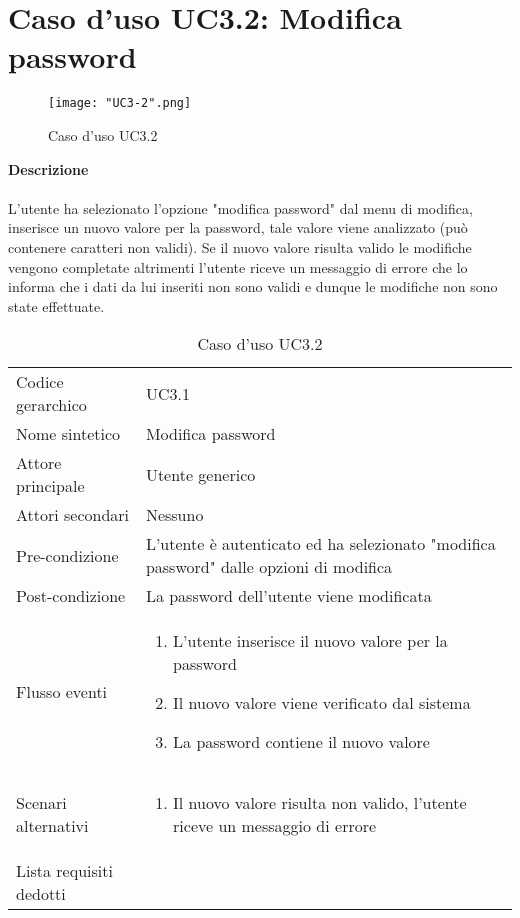 \documentclass[a4paper]{report}
\begin{document}
	 \section{Caso d'uso UC3.2: Modifica password}
	 	\begin{figure}[H]
			\centering
			\texttt{[image: "UC3-2".png]}
			\caption{Caso d'uso UC3.2}
		\end{figure}
	 \textbf{Descrizione} \\ \\
	 L'utente ha selezionato l'opzione "modifica password" dal menu di modifica, inserisce un nuovo valore
	 per la password, tale valore viene analizzato (può contenere caratteri non validi). 
	 Se il nuovo valore risulta valido le modifiche vengono completate altrimenti l'utente riceve 
	 un messaggio di errore che lo informa che i dati da lui inseriti non sono validi e dunque le modifiche non
	 sono state effettuate.
		\begin{table}[H]
		\begin{tabularx}{\textwidth}{X | X}\toprule
			\rowcolor{orange!65}Codice gerarchico & UC3.1 \\
			Nome sintetico & Modifica password \\
			\rowcolor{orange!65}Attore principale & Utente generico\\
			Attori secondari & Nessuno \\
			\rowcolor{orange!65}Pre-condizione & L'utente è autenticato ed ha selezionato "modifica
			 password" dalle opzioni di modifica\\
			Post-condizione & La password dell'utente viene modificata \\
			\rowcolor{orange!65}Flusso eventi & \begin{enumerate}
			\item L'utente inserisce il nuovo valore per la password
			\item Il nuovo valore viene verificato dal sistema
			\item La password contiene il nuovo valore
			\end{enumerate} \\
			Scenari alternativi & \begin{enumerate}
			\item Il nuovo valore risulta non valido, l'utente riceve un messaggio di errore
			\end{enumerate} \\
			\rowcolor{orange!65}Lista requisiti dedotti & \\
			\bottomrule
		\end{tabularx}
		\caption{Caso d'uso UC3.2}
	 \end{table}
\end{document}
